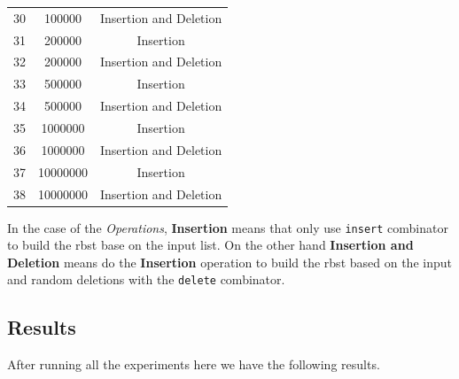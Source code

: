 \documentclass[12pt, a4paper]{article}
\begin{document}
\begin{table}[H]
\begin{tabular}{ |c|c|c| }
      30 & 100000 & Insertion and Deletion \\
      31 & 200000 & Insertion \\
      32 & 200000 & Insertion and Deletion \\
      33 & 500000 & Insertion \\
      34 & 500000 & Insertion and Deletion \\
      35 & 1000000 & Insertion \\
      36 & 1000000 & Insertion and Deletion \\
      37 & 10000000 & Insertion \\
      38 & 10000000 & Insertion and Deletion \\
      \hline
    \end{tabular}
    \label{table:experiments_detail}
  \end{table}


  In the case of the \textit{Operations}, \textbf{Insertion} means that only use \lstinline[language=Haskell]!insert! combinator to build the \acrshort{rbst} base on the input list. On the other hand \textbf{Insertion and Deletion} means do the \textbf{Insertion} operation to build the \acrshort{rbst} based on the input and random deletions with the \lstinline[language=Haskell]!delete! combinator.

\subsection{Results}
After running all the experiments here we have the following results.
\end{document}
